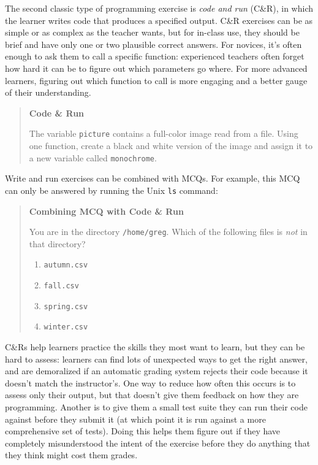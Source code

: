 The second classic type of programming exercise is \emph{code and run}
(C\&R), in which the learner writes code that produces a specified
output. C\&R exercises can be as simple or as complex as the teacher
wants, but for in-class use, they should be brief and have only one or
two plausible correct answers. For novices, it's often enough to ask
them to call a specific function: experienced teachers often forget how
hard it can be to figure out which parameters go where. For more
advanced learners, figuring out which function to call is more engaging
and a better gauge of their understanding.

\begin{quote}\setlength{\parindent}{0pt}
\textbf{Code \& Run}

The variable \texttt{picture} contains a full-color image read from a file.
Using one function, create a black and white version of the image and
assign it to a new variable called \texttt{monochrome}.
\end{quote}

Write and run exercises can be combined with MCQs. For example, this MCQ
can only be answered by running the Unix \texttt{ls} command:

\begin{quote}\setlength{\parindent}{0pt}
\textbf{Combining MCQ with Code \& Run}

You are in the directory \texttt{/home/greg}. Which of the following files is
\emph{not} in that directory?

\begin{enumerate}
\tightlist
\item
  \texttt{autumn.csv}
\item
  \texttt{fall.csv}
\item
  \texttt{spring.csv}
\item
  \texttt{winter.csv}
\end{enumerate}
\end{quote}

C\&Rs help learners practice the skills they most want to learn, but
they can be hard to assess: learners can find lots of unexpected ways to
get the right answer, and are demoralized if an automatic grading system
rejects their code because it doesn't match the instructor's. One way to
reduce how often this occurs is to assess only their output, but that
doesn't give them feedback on how they are programming. Another is to
give them a small test suite they can run their code against before they
submit it (at which point it is run against a more comprehensive set of
tests). Doing this helps them figure out if they have completely
misunderstood the intent of the exercise before they do anything that
they think might cost them grades.


